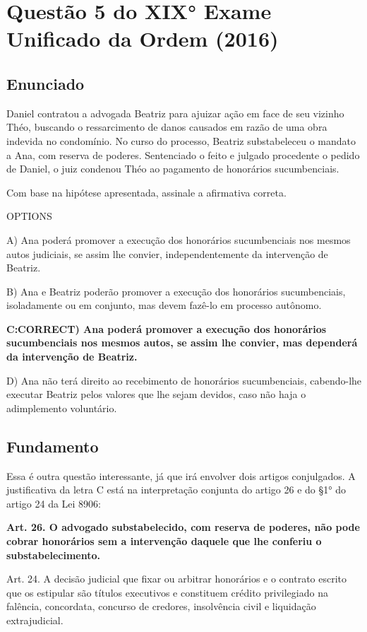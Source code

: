 \documentclass[12pt]{article}
\begin{document}
\section{Questão 5 do XIX° Exame Unificado da Ordem (2016)}

\subsection{Enunciado}

Daniel contratou a advogada Beatriz para ajuizar ação em face 
de seu vizinho Théo, buscando o ressarcimento de danos 
causados em razão de uma obra indevida no condomínio. No 
curso do processo, Beatriz substabeleceu o mandato a Ana, 
com reserva de poderes. Sentenciado o feito e julgado 
procedente o pedido de Daniel, o juiz condenou Théo ao 
pagamento de honorários sucumbenciais. 
 
Com base na hipótese apresentada, assinale a afirmativa 
correta. 

OPTIONS

A) Ana poderá promover a execução dos honorários 
sucumbenciais nos mesmos autos judiciais, se assim lhe 
convier, independentemente da intervenção de Beatriz. 

B) Ana e Beatriz poderão promover a execução dos 
honorários sucumbenciais, isoladamente ou em conjunto, 
mas devem fazê-lo em processo autônomo. 

\textbf{C:CORRECT) Ana poderá promover a execução dos honorários 
sucumbenciais nos mesmos autos, se assim lhe convier, 
mas dependerá da intervenção de Beatriz. }

D) Ana não terá direito ao recebimento de honorários 
sucumbenciais, cabendo-lhe executar Beatriz pelos valores 
que lhe sejam devidos, caso não haja o adimplemento 
voluntário. 

\subsection{Fundamento}

Essa é outra questão interessante, já que irá envolver dois artigos conjulgados. A justificativa da letra C está na interpretação conjunta do artigo 26 e do §1° do artigo 24 da Lei 8906:

\textbf{Art. 26. O advogado substabelecido, com reserva de poderes, não pode cobrar honorários sem a intervenção daquele que lhe conferiu o substabelecimento. }
	
Art. 24. A decisão judicial que fixar ou arbitrar honorários e o contrato escrito que os estipular são títulos executivos e constituem crédito privilegiado na falência, concordata, concurso de credores, insolvência civil e liquidação extrajudicial. 
\end{document}

